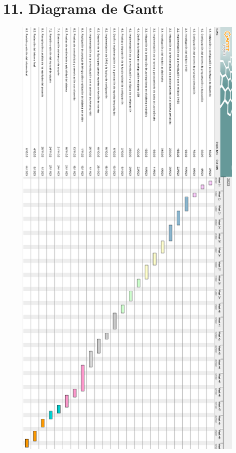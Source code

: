 \documentclass[
11pt, %
codirector, %
]{charter}
\begin{document}
\section{11. Diagrama de Gantt}
\label{sec:gantt}
\begin{figure}[htpb]
\centering 
\includegraphics[height=0.78\textheight]{./Figuras/gantt_rotado.png}

\label{fig:diagGantt}
\end{figure}
\end{document}
